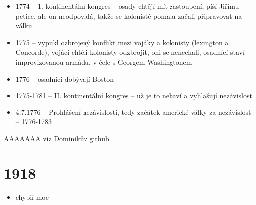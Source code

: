 \documentclass{article}
\begin{document}
\begin{itemize}
\begin{itemize}
  \end{itemize}
  \item 1774 -- 1. kontinentální kongres -- osady chtějí mít zastoupení, píší Jiřímu petice, ale on neodpovídá, takže se kolonisté pomalu začali připravovat na válku
  \item 1775 -- vypukl ozbrojený konflikt mezi vojáky a kolonisty (lexington a Concorde), vojáci chtěli kolonisty odzbrojit, oni se nenechali, osadnící staví improvizovanou armádu, v čele s Georgem Washingtonem
  \item 1776 -- osadnící dobývají Boston
  \item 1775-1781 -- II. kontinentální kongres -- už je to nebaví a vyhlašují nezávislost
  \item 4.7.1776 -- Prohlášení nezávislosti, tedy začátek americké války za nezávislost -- 1776-1783
\end{itemize}

AAAAAAA viz Dominikův github

\part{1918}
\begin{itemize}
  \item chybií moc
\end{itemize}
\end{document}

